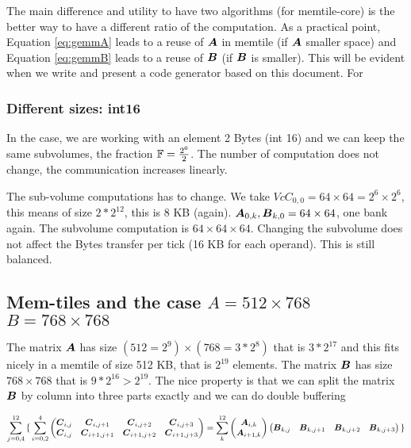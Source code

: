 \documentclass[conference]{IEEEtran}
\begin{document}
The main difference and utility to have two algorithms (for
memtile-core) is the better way to have a different ratio of the
computation. As a practical point, Equation \ref{eq:gemmA} leads to a
reuse of ${\boldsymbol A}$ in memtile (if ${\boldsymbol A}$ smaller space) and Equation
\ref{eq:gemmB} leads to a reuse of ${\boldsymbol B}$ (if ${\boldsymbol B}$ is smaller).
This will be evident when we write and present a code generator based
on this document. For


\subsubsection{Different sizes: int16}
In the case, we are working with an element 2 Bytes (int 16) and we
can keep the same subvolumes, the fraction $\mathbb{F} = \frac{2^6}{2}$. The
number of computation does not change, the communication increases
linearly.

The sub-volume computations has to change. We take $Vc{C}_{0,0} =
64\times 64 = 2^6 \times 2^6$, this means of size $2*2^12$, this is 8
KB (again). ${\boldsymbol A}_{0,k}, {\boldsymbol B}_{k,0} = 64 \times 64$, one bank
again. The subvolume computation is $64\times 64 \times 64$. Changing
the subvolume does not affect the Bytes transfer per tick (16 KB for
each operand). This is still balanced.



\subsection{Mem-tiles and the case   $A=512\times 768$ $B=768\times 768$ }

The matrix ${\boldsymbol A}$ has size $(512=2^9) \times (768= 3*2^8)$ that is
$3*2^{17}$ and this fits nicely in a memtile of size 512 KB, that is
$2^{19}$ elements.  The matrix ${\boldsymbol B}$ has size $768 \times 768$ that
is $9*2^{16}>2^{19}$. The nice property is that we can split the
matrix ${\boldsymbol B}$ by column into three parts exactly and we can do
double buffering


{\small \begin{equation*}
    \sum_{j=0,4}^{12}
    { \{ } \sum_{i=0,2}^4
  \begin{pmatrix}
    {\boldsymbol C}_{i,j}  & {\boldsymbol C}_{i,j+1}    & {\boldsymbol C}_{i,j+2}    &{\boldsymbol C}_{i,j+3} \\
    {\boldsymbol C}_{i,j}  & {\boldsymbol C}_{i+1,j+1}   & {\boldsymbol C}_{i+1,j+2}  & {\boldsymbol C}_{i+1,j+3} \\
  \end{pmatrix}    = \sum_k^{12}
  \begin{pmatrix}
    {\boldsymbol A}_{i,k}  \\
    {\boldsymbol A}_{i+1,k}   \\
  \end{pmatrix}  
  \begin{pmatrix}
    {\boldsymbol B}_{k,j}  &  {\boldsymbol B}_{k,j+1}  & {\boldsymbol B}_{k,j+2}  &{\boldsymbol B}_{k,j+3} \\
  \end{pmatrix}
  { \}}    
\end{equation*}
}
\end{document}
